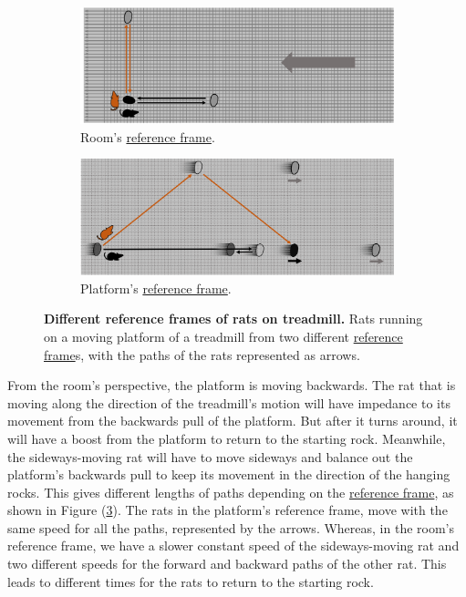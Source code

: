 \begin{figure}[H]
	\centering
	\begin{subfigure}{0.9\textwidth}
		\centering
		\includegraphics[width = \textwidth]{images/pdf/rats_moving.pdf}
		\caption{Room's \protect\hyperlink{def-Reference-frame}{reference frame}.}
		\label{fig: rat with moving platform}
	\end{subfigure}
	\begin{subfigure}{0.9\textwidth}
		\vspace{0.2cm}
		\centering
		\includegraphics[width = \textwidth]{images/pdf/rats_platform_frame.pdf}
		\caption{Platform's \protect\hyperlink{def-Reference-frame}{reference frame}.}
		\label{fig: rat platform reference frame}
	\end{subfigure}
	\caption{\textbf{Different reference frames of rats on treadmill.} Rats running on a moving platform of a treadmill from two different \protect\hyperlink{def-Reference-frame}{reference frame}s, with the paths of the rats represented as arrows.}
	\label{fig: treadmill}
\end{figure}

From the room's perspective, the platform is moving backwards.
The rat that is moving along the direction of the treadmill's motion will have impedance to its movement from the backwards pull of the platform.
But after it turns around, it will have a boost from the platform to return to the starting rock.
Meanwhile, the sideways-moving rat will have to move sideways and balance out the platform's backwards pull to keep its movement in the direction of the hanging rocks.
This gives different lengths of paths depending on the \hyperlink{def-Reference-frame}{reference frame}, as shown in Figure (\ref{fig: treadmill}).
The rats in the platform's reference frame, move with the same speed for all the paths, represented by the arrows.
Whereas, in the room's reference frame, we have a slower constant speed of the sideways-moving rat and two different speeds for the forward and backward paths of the other rat.
This leads to different times for the rats to return to the starting rock.

